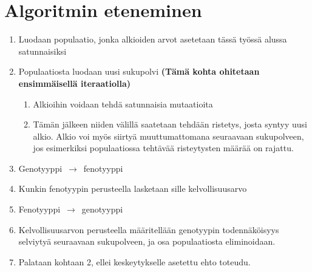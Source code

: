 \section{Algoritmin eteneminen}

\begin{enumerate}
	\item Luodaan populaatio, jonka alkioiden arvot asetetaan tässä työssä alussa satunnaisiksi
	\item Populaatiosta luodaan uusi sukupolvi \textbf{(Tämä kohta ohitetaan ensimmäisellä iteraatiolla)}
	\begin{enumerate}
		\item Alkioihin voidaan tehdä satunnaisia mutaatioita
		\item Tämän jälkeen niiden välillä saatetaan tehdään ristetys, josta syntyy uusi alkio.
		Alkio voi myös siirtyä muuttumattomana seuraavaan sukupolveen, jos esimerkiksi
		populaatiossa tehtävää risteytysten määrää on rajattu.
	\end{enumerate}
	\item Genotyyppi~\(\rightarrow\)~fenotyyppi
	\item	Kunkin fenotyypin perusteella lasketaan sille kelvollisuusarvo
	\item Fenotyyppi~\(\rightarrow\)~genotyyppi
	\item Kelvollisuusarvon perusteella määritellään genotyypin todennäköisyys
	selviytyä seuraavaan sukupolveen, ja osa populaatiosta eliminoidaan.
	\item Palataan kohtaan 2, ellei keskeytykselle asetettu ehto toteudu.
\end{enumerate}
